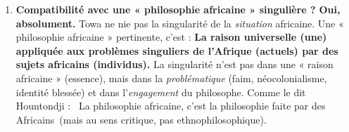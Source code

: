 \documentclass[11pt]{article}
\begin{document}
\begin{corrige}
\begin{enumerate}
\begin{itemize}
\end{itemize}
L'universel se construit \emph{dans} et \emph{par} la praxis de libération.
\item \textbf{Compatibilité avec une « philosophie africaine » singulière ?} \textbf{Oui, absolument.} Towa ne nie pas la singularité de la \emph{situation} africaine. Une « philosophie africaine » pertinente, c'est : \textbf{La raison universelle (une) appliquée aux problèmes singuliers de l'Afrique (actuels) par des sujets africains (individus).} La singularité n'est pas dans une « raison africaine » (essence), mais dans la \emph{problématique} (faim, néocolonialisme, identité blessée) et dans l'\emph{engagement} du philosophe. Comme le dit Hountondji : \guillemotleft~La philosophie africaine, c'est la philosophie faite par des Africains~\guillemotright (mais au sens critique, pas ethnophilosophique).
\end{enumerate}
\end{corrige}
\end{document}
